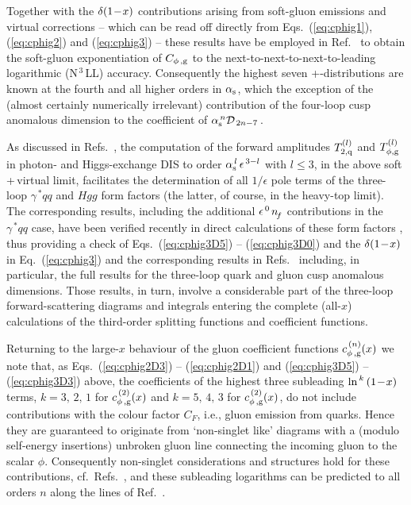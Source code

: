 \documentclass[12pt]{article}
\newcommand{\as}{\alpha_{\rm s}}
\newcommand{\ep}{\epsilon}
\begin{document}
Together with the $\delta \x1$ contributions arising from soft-gluon emissions
and virtual corrections -- which can be read off directly from 
Eqs.~(\ref{eq:cphig1}), (\ref{eq:cphig2}) and (\ref{eq:cphig3}) -- 
these results have be employed in Ref.~\cite{MVV7} to obtain the soft-gluon
exponentiation of $C_{\rm \phi\, , g}$ to the next-to-next-to-next-to-leading
logarithmic (N$^{\,3\:\!}$LL) accuracy. Consequently the highest seven 
+-distributions are known at the fourth and all higher orders in $\as$,
which the exception of the (almost certainly numerically irrelevant) 
contribution of the four-loop cusp anomalous dimension to the coefficient of 
$\as^{\,n} {\cal D}_{\,2n-7\,}$.

As discussed in Refs.~\cite{MVV8,MVV9}, the computation of the forward 
amplitudes $T_{2,\rm q}^{(l)}$ and $T_{\phi,\rm g}^{(l)}$ in photon- and 
Higgs-exchange DIS to order $\as^{\,l} \,\ep^{\,3-l}$ with $l\leq 3$, in the
above soft$\,$+$\,$virtual limit, facilitates the determination of all $1/\ep$ 
pole terms of the three-loop $\gamma^{\,\ast\!} qq$ and $Hgg$ form factors 
(the latter, of course, in the heavy-top limit). 
The corresponding results, including the additional $\ep^{\,0\,}\nf$ 
contributions in the $\gamma^{\,\ast\!}qq$ case, have been verified recently in
direct calculations of these form factors \cite{FF3loop}, thus providing a 
check of Eqs.~(\ref{eq:cphig3D5}) -- (\ref{eq:cphig3D0}) and the $\delta \x1$ 
in Eq.~(\ref{eq:cphig3}) and the corresponding results in 
Refs.~\cite{MVV3,MVV4,MVV6} including, in particular, the full results for the 
three-loop quark and gluon cusp anomalous dimensions.
Those results, in turn, involve a considerable part of the three-loop
forward-scattering diagrams and integrals entering the complete (all-$x$) 
calculations of the third-order splitting functions and coefficient functions.

Returning to the large-$x$ behaviour of the gluon coefficient functions
$c^{\,(n)}_{\rm \phi\, , g}(x)$ we note that, as Eqs.~(\ref{eq:cphig2D3}) --
(\ref{eq:cphig2D1}) and (\ref{eq:cphig3D5}) -- (\ref{eq:cphig3D3}) above, 
the coefficients of the highest three subleading $\ln^{\,k} \x1$ terms,
$k = 3,\,2,\,1$ for $c^{\,(2)}_{\rm \phi\, , g}(x)$ and 
$k = 5,\,4,\,3$ for $c^{\,(2)}_{\rm \phi\, , g}(x)$, do not include 
contributions with the colour factor $C_F$, i.e., gluon emission from quarks. 
Hence they are guaranteed to originate from `non-singlet like' diagrams with a 
(modulo self-energy insertions) unbroken gluon line connecting the incoming 
gluon to the scalar $\phi$. Consequently non-singlet considerations and 
structures hold for these contributions, cf.~Refs.~\cite{DMS05,MV2,MV3}, and 
these subleading logarithms can be predicted to all orders $n$ along the lines 
of Ref.~\cite{MV5}. 
\end{document}

